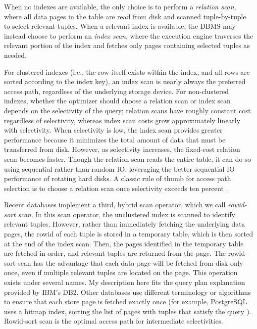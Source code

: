 When no indexes are available, the only choice is to perform a \emph{relation scan}, where all data pages in the table are read from disk and scanned tuple-by-tuple to select relevant tuples.
When a relevant index is available, the DBMS may instead choose to perform an \emph{index scan}, where the execution engine traverses the relevant portion of the index and fetches only pages containing selected tuples as needed.

For clustered indexes (i.e., the row itself exists within the index, and all rows are sorted according to the index key), an index scan is nearly always the preferred access path, regardless of the underlying storage device.  
For non-clustered indexes, whether the optimizer should choose a relation scan or index scan depends on the selectivity of the query; relation scans have roughly constant cost regardless of selectivity, whereas index scan costs grow approximately linearly with selectivity.
When selectivity is low, the index scan provides greater performance because it minimizes the total amount of data that must be transferred from disk.
However, as selectivity increases, the fixed-cost relation scan becomes faster.  
Though the relation scan reads the entire table, it can do so using sequential rather than random IO, leveraging the better sequential IO performance of rotating hard disks.
A classic rule of thumb for access path selection is to choose a relation scan once selectivity exceeds ten percent \cite{RamakrishnanAndGehrke}.

Recent databases implement a third, hybrid scan operator, which we call \emph{rowid-sort scan}.
In this scan operator, the unclustered index is scanned to identify relevant tuples.
However, rather than immediately fetching the underlying data pages, the rowid of each tuple is stored in a temporary table, which is then sorted at the end of the index scan.
Then, the pages identified in the temporary table are fetched in order, and relevant tuples are returned from the page.
The rowid-sort scan has the advantage that each data page will be fetched from disk only once, even if multiple relevant tuples are located on the page. 
This operation exists under several names.
My description here fits the query plan explanation provided by IBM's DB2.
Other databases use different terminology or algorithms to ensure that each store page is fetched exactly once (for example, PostgreSQL uses a bitmap index, sorting the list of pages with tuples that satisfy the query ).
Rowid-sort scan is the optimal access path for intermediate selectivities.

